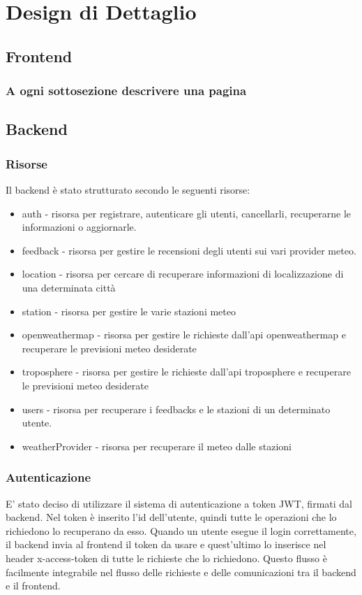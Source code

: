 \chapter{Design di Dettaglio}
\section{Frontend}
\subsection{A ogni sottosezione descrivere una pagina}
\section{Backend}
\subsection{Risorse}
Il backend è stato strutturato secondo le seguenti risorse:
\begin{itemize}
\item auth - risorsa per registrare, autenticare gli utenti, cancellarli, recuperarne le
informazioni o aggiornarle.
\item feedback - risorsa per gestire le recensioni degli utenti sui vari provider meteo.
\item location - risorsa per cercare di recuperare informazioni di localizzazione di una determinata città
\item station - risorsa per gestire le varie stazioni meteo

\item openweathermap - risorsa per gestire le richieste dall'api openweathermap e recuperare le previsioni meteo desiderate
\item troposphere - risorsa per gestire le richieste dall'api troposphere e recuperare le previsioni meteo desiderate
\item users - risorsa per recuperare i feedbacks e le stazioni di un determinato utente.
\item weatherProvider - risorsa per recuperare il meteo dalle stazioni
\end{itemize}
\subsection{Autenticazione}
E' stato deciso di utilizzare il sistema di autenticazione a token JWT, firmati
dal backend.
Nel token è inserito l'id dell'utente, quindi tutte le operazioni che lo
richiedono lo recuperano da esso.
Quando un utente esegue il login correttamente, il backend invia al frontend
il token da usare e quest’ultimo lo inserisce nel header x-access-token di tutte
le richieste che lo richiedono.
Questo flusso è facilmente integrabile nel flusso delle richieste e delle comunicazioni tra il backend e il frontend.
